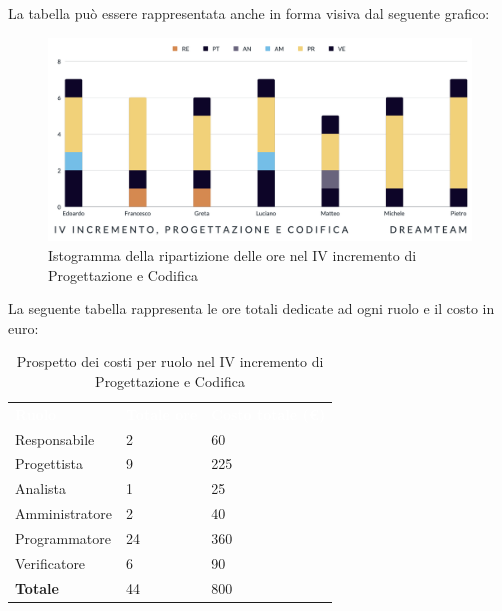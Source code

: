La tabella può essere rappresentata anche in forma visiva dal seguente grafico:
\begin{figure}[H]
\centering
\includegraphics[scale=0.55]{Sezioni/SezioniPreventivo/grafici/Preventivo_progettazione_IV.png}
\caption{Istogramma della ripartizione delle ore nel IV incremento di Progettazione e Codifica}
\end{figure}

La seguente tabella rappresenta le ore totali dedicate ad ogni ruolo e il costo in euro:

\begin{table}[H]
\begin{center}
\renewcommand{\arraystretch}{1.5}
\begin{tabular}{ m{}<{\centering}  m{}<{\centering} m{}<{\centering}}
	\rowcolor{darkblue}
	\textcolor{white}{\textbf{Ruolo}}&\textcolor{white}{\textbf{Totale ore}}&\textcolor{white}{\textbf{Costo totale (\euro)}}\\ 

	Responsabile  & 2 & 60 \\	
	
	Progettista & 9 & 225 \\
	
	Analista & 1 & 25 \\

	Amministratore & 2 & 40 \\
	
	Programmatore & 24 & 360 \\
	
	Verificatore & 6 & 90 \\
	
	\textbf{Totale} & 44 & 800 \\
	
\end{tabular}
\caption{Prospetto dei costi per ruolo nel IV incremento di Progettazione e Codifica}
\end{center}
\end{table}

